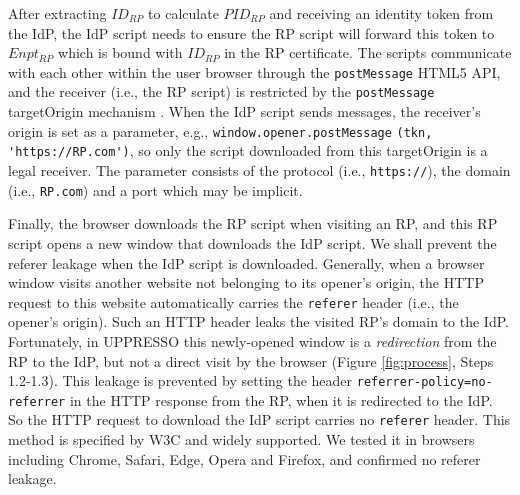 After extracting $ID_{RP}$ to calculate $PID_{RP}$
    and receiving an identity token from the IdP,
    the IdP script needs to ensure the RP script will forward this token to $Enpt_{RP}$
        which is bound with $ID_{RP}$ in the RP certificate.
The scripts communicate with each other within the user browser through the \verb+postMessage+ HTML5 API,
and the receiver (i.e., the RP script)
 is restricted by the \verb+postMessage+ targetOrigin mechanism \cite{postm-targeto}.
When the IdP script sends messages,
 the receiver's origin is set as a parameter,
  e.g., \verb+window.opener.postMessage+ \verb+(tkn, 'https://RP.com')+,
  so only the script downloaded from this targetOrigin is a legal receiver.
The parameter consists of
    the protocol (i.e., \verb+https://+),
    the domain  (i.e., \verb+RP.com+)
    and a port which may be implicit.

Finally,
    the browser downloads the RP script when visiting an RP,
     and this RP script opens a new window that downloads the IdP script.
We shall prevent the referer leakage when the IdP script is downloaded.
Generally, when a browser window visits another website not belonging to its opener's origin,
 the HTTP request to this website automatically carries the \verb+referer+ header (i.e., the opener's origin).
Such an HTTP header leaks the visited RP's domain to the IdP.
Fortunately, in UPPRESSO this newly-opened window is a \emph{redirection} from the RP to the IdP,
 but not a direct visit by the browser (Figure \ref{fig:process}, Steps 1.2-1.3).
This leakage is prevented by setting the header \verb+referrer-policy=no-referrer+ in the HTTP response from the RP, when it is redirected to the IdP.
So the HTTP request to download the IdP script carries no \verb+referer+ header.
This method is specified by W3C \cite{referer_policy} and widely supported.
We tested it in browsers including Chrome, Safari, Edge, Opera and Firefox, and confirmed no referer leakage.




